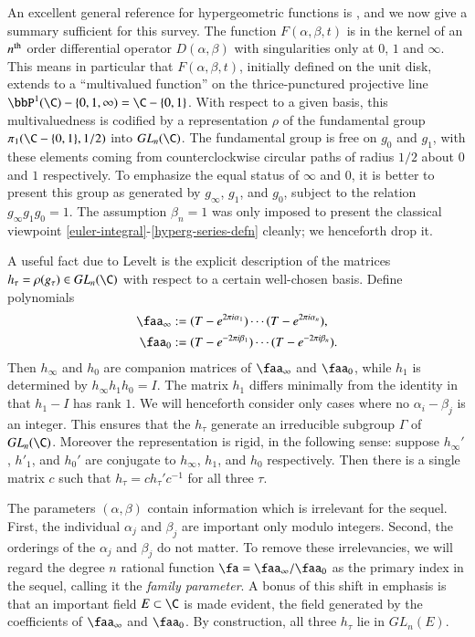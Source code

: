 \documentclass{notices}
\numberwithin{equation}{section}
\numberwithin{table}{section}
\numberwithin{figure}{section}
\begin{document}
 An excellent general reference for hypergeometric functions is \cite{BH},
and we now give a summary sufficient for this survey.   The function
$F(\alpha,\beta,t)$ is in the kernel of an $n^{\rm th}$ order 
differential operator $D(\alpha,\beta)$ with singularities 
only at $0$, $1$ and $\infty$.   This means in particular 
that $F(\alpha,\beta,t)$, initially defined on the unit disk, 
extends to a ``multivalued function'' on the thrice-punctured
projective line $\bbP^1(\C)-\{0,1,\infty) = \C-\{0,1\}$.   With respect to a given
basis, this multivaluedness is codified by a representation $\rho$ of the fundamental group
$\pi_1(\C-\{0,1\},1/2)$ into $GL_n(\C)$.   The 
fundamental group is free on $g_0$ and $g_1$, 
with these elements coming from counterclockwise 
circular paths of radius $1/2$ about $0$ and $1$ 
respectively.  To emphasize the equal status of $\infty$ and $0$, it is better
to present this group as generated by $g_\infty$, $g_1$, 
and $g_0$, subject to the relation 
$g_\infty g_1 g_0=1$.   The assumption 
$\beta_n=1$ was only imposed to present
the classical viewpoint 
\eqref{euler-integral}-\eqref{hyperg-series-defn} cleanly;
we henceforth drop it.

A useful fact due to Levelt is the explicit description of the matrices 
$h_\tau=\rho(g_\tau) \in GL_n(\C)$ with respect to a certain well-chosen basis.  
Define polynomials
\begin{align*}
\faa_\infty & := (T-e^{2\pi i \alpha_1})\cdots(T-e^{2\pi i\alpha_n}), \\
\faa_0 &:=(T-e^{-2\pi i \beta_1})\cdots(T-e^{-2\pi i  \beta_n}).
\end{align*}
Then $h_\infty$ and $h_0$ 
are companion matrices of $\faa_\infty$ and $\faa_0$, while $h_1$
is determined by $h_\infty h_1 h_0=I$.   The
matrix $h_1$ differs minimally from 
the identity in that $h_1-I$ has rank
$1$.   We will henceforth consider only cases where
no $\alpha_i-\beta_j$ is an integer.  This ensures
that the $h_\tau$ generate an irreducible 
subgroup $\Gamma$ of $GL_n(\C)$.  Moreover the 
representation is rigid, in the following
sense: suppose $h_\infty'$, $h'_1$, and $h_0'$
are conjugate to $h_\infty$, $h_1$, and $h_0$
respectively.  Then there is a single 
matrix $c$ such that $h_\tau = ch_\tau'c^{-1}$ 
for all three $\tau$.  

    The parameters $(\alpha,\beta)$ 
contain information which is irrelevant for the
sequel.   First, the individual $\alpha_j$ and
$\beta_j$ are important only modulo integers.
Second, the orderings of the $\alpha_j$ and $\beta_j$
  do not matter.  To remove these irrelevancies, we will regard the
degree $n$ rational function $\fa = \faa_\infty/\faa_0$ as the primary
index in the sequel, calling it the {\em family parameter}.  A bonus
of this shift in emphasis is that an important field $E \subset \C$ is
made evident, the field generated by the coefficients of $\faa_\infty$
and $\faa_0$.  By construction, all three $h_\tau$ lie in $GL_n(E)$.
\end{document}
